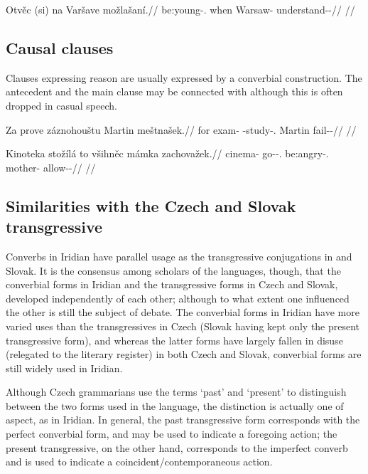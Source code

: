 \pex
\begingl
\gla Otvěc (si) na Varšave možlašaní.//
\glb be:young-\Cv{}.\Ipf{} when \Loc{} Warsaw-\Acc{} understand-\Av{}-\Ret{}//
\glft {}//
\endgl
\xe

\subsection{Causal clauses}

Clauses expressing reason are usually expressed by a converbial construction.
The antecedent and the main clause may be connected with 
although this is often dropped in casual speech.

\pex
\begingl
\gla Za prove záznohouštu Martin meštnašek.//
\glb for exam-\Acc{} \Neg{}-study-\Cv{}.\Pf{} Martin fail-\Av{}-\Pf{}//
\glft {}//
\endgl
\xe


\pex
\begingl
\gla Kinoteka stožílá to všihněc mámka zachovažek.//
\glb cinema-\Acc{} go-\Av{}-\Sbj{}.\Ipf{} \Rz{} be:angry-\Cv{}.\Ipf{} mother-\Dim{} allow-\Av{}-\Pf{}//
\glft {}//
\endgl
\xe


\subsection{Similarities with the Czech and Slovak transgressive}

Converbs in Iridian have parallel usage as the
transgressive conjugations in 
and Slovak. It is the consensus among scholars of the languages,
though, that the converbial forms in Iridian and the transgressive forms in
Czech and Slovak, developed independently of each other; although to what extent
one influenced the other is still the subject of debate. The converbial forms in
Iridian have more varied uses than the transgressives in Czech (Slovak having
kept only the present transgressive form), and whereas the latter forms have
largely fallen in disuse (relegated to the literary register) in both Czech and
Slovak, converbial forms are still widely used in Iridian.

Although Czech grammarians use the terms `past' and `present' to distinguish
between the two forms used in the language, the distinction is actually one of
aspect, as in Iridian. In general, the past transgressive form
corresponds with the perfect converbial form, and may be used to indicate a
foregoing action; the present transgressive, on the other hand, corresponds to
the imperfect converb and is used to indicate a coincident/contemporaneous
action.

